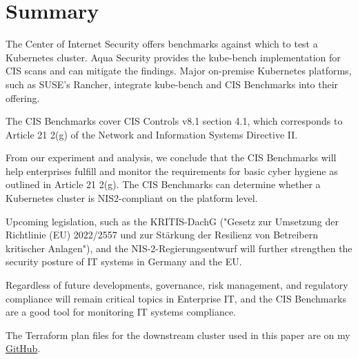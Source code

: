 %
%

\pagebreak
\section{Summary}

\onehalfspacing

The Center of Internet Security offers benchmarks against which to test a Kubernetes cluster. Aqua Security provides the kube-bench implementation for CIS scans and can mitigate the findings. Major on-premise Kubernetes platforms, such as SUSE's Rancher, integrate kube-bench and CIS Benchmarks into their offering.

The CIS Benchmarks cover CIS Controls v8.1 section 4.1, which corresponds to Article 21 2(g) of the Network and Information Systems Directive II.

From our experiment and analysis, we conclude that the CIS Benchmarks will help enterprises fulfill and monitor the requirements for basic cyber hygiene as outlined in Article 21 2(g). The CIS Benchmarks can determine whether a Kubernetes cluster is NIS2-compliant on the platform level.

Upcoming legislation, such as the KRITIS-DachG ("Gesetz zur Umsetzung der Richtlinie (EU) 2022/2557 und zur Stärkung der Resilienz von Betreibern kritischer Anlagen"), and the NIS-2-Regierungsentwurf will further strengthen the security posture of IT systems in Germany and the EU.

Regardless of future developments, governance, risk management, and regulatory compliance will remain critical topics in Enterprise IT, and the CIS Benchmarks are a good tool for monitoring IT systems compliance.

The Terraform plan files for the downstream cluster used in this paper are on my \href{https://github.com/chfrank-cgn/Rancher}{GitHub}.

